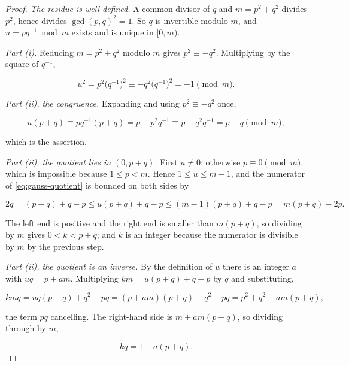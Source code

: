 \begin{proof}
\emph{The residue is well defined.} A common divisor of $q$ and $m=p^2+q^2$
divides $p^2$, hence divides $\gcd(p,q)^2=1$. So $q$ is invertible modulo $m$,
and $u=pq^{-1}\bmod m$ exists and is unique in $[0,m)$.

\emph{Part (i).} Reducing $m=p^2+q^2$ modulo $m$ gives $p^2\equiv-q^2$.
Multiplying by the square of $q^{-1}$,

\begin{equation}
 u^2=p^2\bigl(q^{-1}\bigr)^2\equiv-q^2\bigl(q^{-1}\bigr)^2=-1\pmod m.
\end{equation}

\emph{Part (ii), the congruence.} Expanding and using $p^2\equiv-q^2$ once,

\begin{equation}
 u(p+q)\equiv pq^{-1}(p+q)=p+p^2q^{-1}\equiv p-q^2q^{-1}=p-q\pmod m,
 \label{eq:gauss-congruence-core}
\end{equation}

which is the assertion.

\emph{Part (ii), the quotient lies in $(0,p+q)$.} First $u\neq0$: otherwise
$p\equiv0\pmod m$, which is impossible because $1\leqslant p<m$. Hence
$1\leqslant u\leqslant m-1$, and the numerator of \cref{eq:gauss-quotient} is
bounded on both sides by

\begin{equation}
 2q=(p+q)+q-p\leqslant u(p+q)+q-p\leqslant(m-1)(p+q)+q-p=m(p+q)-2p.
\end{equation}

The left end is positive and the right end is smaller than $m(p+q)$, so
dividing by $m$ gives $0<k<p+q$; and $k$ is an integer because the numerator is
divisible by $m$ by the previous step.

\emph{Part (ii), the quotient is an inverse.} By the definition of $u$ there is
an integer $a$ with $uq=p+am$. Multiplying $km=u(p+q)+q-p$ by $q$ and
substituting,

\begin{equation}
 kmq=uq(p+q)+q^2-pq=(p+am)(p+q)+q^2-pq=p^2+q^2+am(p+q),
\end{equation}

the term $pq$ cancelling. The right-hand side is $m+am(p+q)$, so dividing
through by $m$,

\begin{equation}
 kq=1+a(p+q).
 \label{eq:gauss-quotient-inverse}
\end{equation}


\end{proof}
